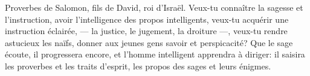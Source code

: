 Proverbes de Salomon, fils de David, roi d’Israël.
Veux-tu connaître la sagesse et l’instruction,
	avoir l’intelligence des propos intelligents,
	veux-tu acquérir une instruction éclairée,
	--- la justice, le jugement, la droiture ---,
	veux-tu rendre astucieux les naïfs,
	donner aux jeunes gens savoir et perspicacité?
Que le sage écoute, il progressera encore,
	et l’homme intelligent apprendra à diriger:
il saisira les proverbes et les traits d’esprit,
	les propos des sages et leurs énigmes.
